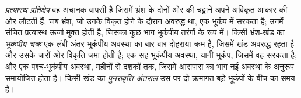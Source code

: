 \begin{definition}[प्रत्यास्थ प्रतिक्षेप, भूकंपीय चक्र, पुनरावृत्ति अंतराल]
\label{def:b1:earthquake-source:seismic-cycle}
\emph{प्रत्यास्थ प्रतिक्षेप} वह अचानक वापसी है जिसमें भ्रंश के दोनों ओर की चट्टानें अपने अविकृत आकार की ओर लौटती हैं, जब भ्रंश, जो उनके विकृत होने के दौरान अवरुद्ध था, एक भूकंप में सरकता है; उनमें संचित प्रत्यास्थ ऊर्जा मुक्त होती है, जिसका कुछ भाग भूकंपीय तरंगों के रूप में। किसी भ्रंश-खंड का \emph{भूकंपीय चक्र} एक लंबी अंतर-भूकंपीय अवस्था का बार-बार दोहराया क्रम है, जिसमें खंड अवरुद्ध रहता है और उसके चारों ओर विकृति जमा होती है; एक सह-भूकंपीय अवस्था, यानी भूकंप, जिसमें वह सरकता है; और एक पश्च-भूकंपीय अवस्था, महीनों से दशकों तक, जिसमें आसपास का भाग नई अवस्था के अनुरूप समायोजित होता है। किसी खंड का \emph{पुनरावृत्ति अंतराल} उस पर दो क्रमागत बड़े भूकंपों के बीच का समय है।
\end{definition}

